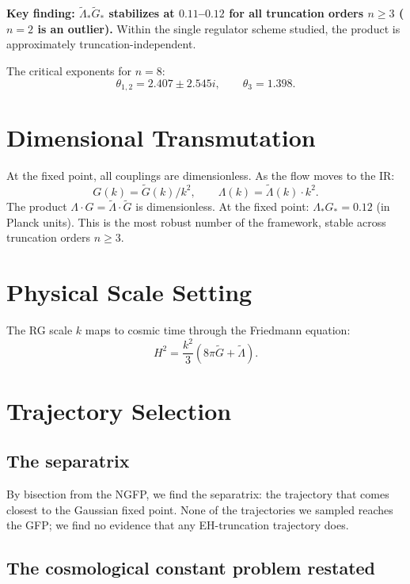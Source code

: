 \documentclass[12pt]{article}
\begin{document}
\textbf{Key finding: $\tilde\Lambda_*\tilde G_*$ stabilizes at $0.11$--$0.12$ for all truncation orders $n\ge3$ ($n=2$ is an outlier).} Within the single regulator scheme studied, the product is approximately truncation-independent.

The critical exponents for $n=8$:
\begin{equation}
\theta_{1,2} = 2.407 \pm 2.545i, \qquad \theta_3 = 1.398.
\end{equation}

\section{Dimensional Transmutation}

At the fixed point, all couplings are dimensionless. As the flow moves to the IR:
\begin{equation}
G(k) = \tilde G(k)/k^2, \qquad \Lambda(k) = \tilde\Lambda(k)\cdot k^2.
\end{equation}
The product $\Lambda\cdot G = \tilde\Lambda\cdot\tilde G$ is dimensionless. At the fixed point: $\Lambda_*G_* = 0.12$ (in Planck units). This is the most robust number of the framework, stable across truncation orders $n\ge3$.

\section{Physical Scale Setting}

The RG scale $k$ maps to cosmic time through the Friedmann equation:
\begin{equation}
H^2 = \frac{k^2}{3}\left(8\pi\tilde G + \tilde\Lambda\right).
\end{equation}

\section{Trajectory Selection}

\subsection{The separatrix}

By bisection from the NGFP, we find the separatrix: the trajectory that comes closest to the Gaussian fixed point. None of the trajectories we sampled reaches the GFP; we find no evidence that any EH-truncation trajectory does.

\subsection{The cosmological constant problem restated}
\end{document}
